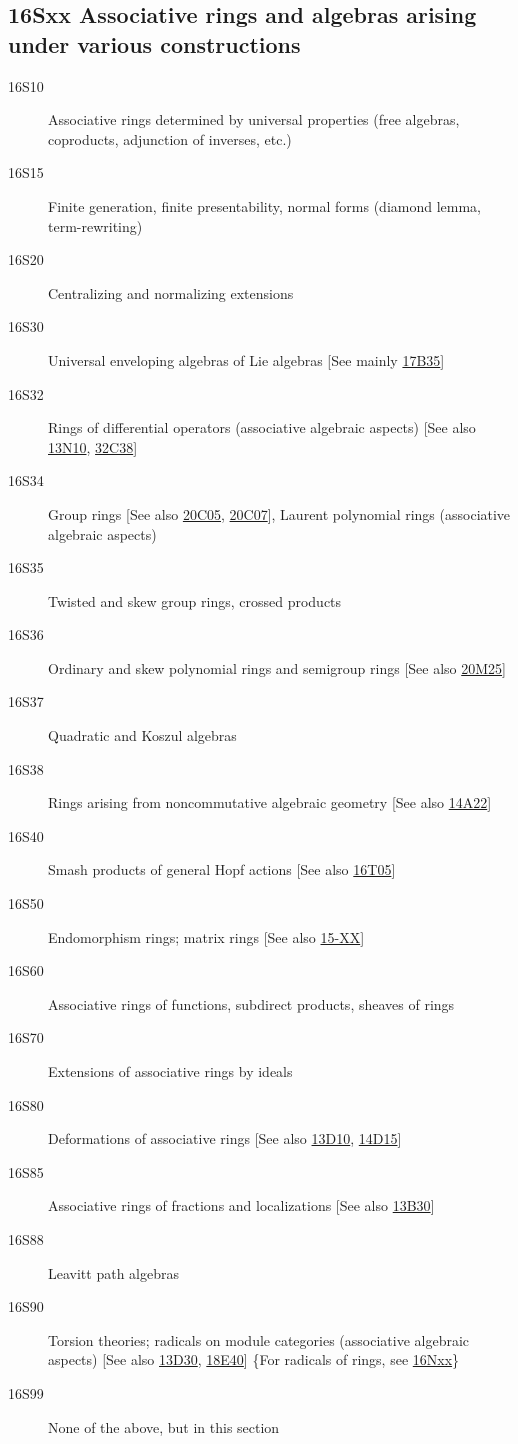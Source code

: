 \subsection*{16Sxx Associative rings and algebras arising under various constructions}\label{16Sxx}
\begin{description}  
\item [16S10]\label{16S10} Associative rings determined by universal properties (free algebras, coproducts, adjunction of inverses, etc.)
\item [16S15]\label{16S15} Finite generation, finite presentability, normal forms (diamond lemma, term-rewriting)
\item [16S20]\label{16S20} Centralizing and normalizing extensions
\item [16S30]\label{16S30} Universal enveloping algebras of Lie algebras [See mainly \hyperref[17B35]{17B35}]
\item [16S32]\label{16S32} Rings of differential operators (associative algebraic aspects) [See also \hyperref[13N10]{13N10}, \hyperref[32C38]{32C38}]
\item [16S34]\label{16S34} Group rings [See also \hyperref[20C05]{20C05}, \hyperref[20C07]{20C07}], Laurent polynomial rings (associative algebraic aspects)
\item [16S35]\label{16S35} Twisted and skew group rings, crossed products
\item [16S36]\label{16S36} Ordinary and skew polynomial rings and semigroup rings [See also \hyperref[20M25]{20M25}]
\item [16S37]\label{16S37} Quadratic and Koszul algebras
\item [16S38]\label{16S38} Rings arising from noncommutative algebraic geometry [See also \hyperref[14A22]{14A22}]
\item [16S40]\label{16S40} Smash products of general Hopf actions [See also \hyperref[16T05]{16T05}]
\item [16S50]\label{16S50} Endomorphism rings; matrix rings [See also \hyperref[15-XX]{15-XX}]
\item [16S60]\label{16S60} Associative rings of functions, subdirect products, sheaves of rings
\item [16S70]\label{16S70} Extensions of associative rings by ideals
\item [16S80]\label{16S80} Deformations of associative rings [See also \hyperref[13D10]{13D10}, \hyperref[14D15]{14D15}]
\item [16S85]\label{16S85} Associative rings of fractions and localizations [See also \hyperref[13B30]{13B30}]
\item [16S88]\label{16S88} Leavitt path algebras
\item [16S90]\label{16S90} Torsion theories; radicals on module categories (associative algebraic aspects) [See also \hyperref[13D30]{13D30}, \hyperref[18E40]{18E40}] \{For radicals of rings, see \hyperref[16Nxx]{16Nxx}\}
\item [16S99]\label{16S99} None of the above, but in this section
\end{description}
